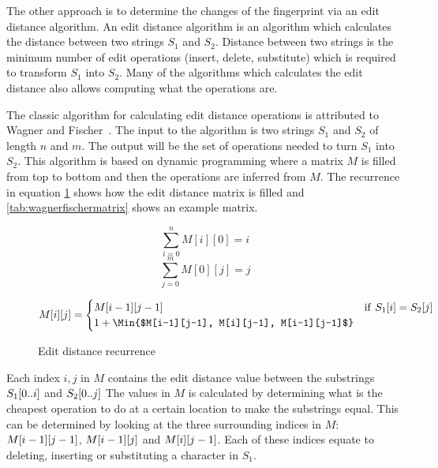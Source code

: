 The other approach is to determine the changes of the fingerprint via an edit distance
algorithm. An edit distance algorithm is an algorithm which calculates the distance
between two strings $S_1$ and $S_2$. Distance between two strings is the minimum number of
edit operations (insert, delete, substitute) which is required to transform $S_1$ into
$S_2$. Many of the algorithms which calculates the edit distance also allows computing
what the operations are.

The classic algorithm for calculating edit distance operations is attributed to Wagner and
Fischer~\cite{WagnerFischer}. The input to the algorithm is two strings $S_1$ and $S_2$ of
length $n$ and $m$. The output will be the set of operations needed to turn $S_1$ into
$S_2$. This algorithm is based on dynamic programming where a matrix $M$ is filled from
top to bottom and then the operations are inferred from $M$. The recurrence in equation
\ref{eq:editdistancerecurrence} shows how the edit distance matrix is filled and
\ref{tab:wagnerfischermatrix} shows an example matrix.

\begin{figure}[t]
    \begin{center}
	$$
		\sum^{n}_{i = 0}{M[i][0] = i}
	$$
	$$
		\sum^{m}_{j = 0}{M[0][j] = j}
	$$

	\begin{gather*}
		M[i][j] =
		\begin{cases}
			M[i-1][j-1] & \mathrm{if\ } S_1[i] = S_2[j] \\
            1 + \Min{$M[i-1][j-1], M[i][j-1], M[i-1][j-1]$}
		\end{cases}
	\end{gather*}
	\caption{Edit distance recurrence}
	\label{eq:editdistancerecurrence}
    \end{center}
\end{figure}

Each index $i, j$ in $M$ contains the edit distance value between the substrings
$S_1[{0..i}]$ and $S_2[{0..j}]$ The values in $M$ is calculated by
determining what is the cheapest operation to do at a certain location to make the
substrings equal. This can be determined by looking at the three surrounding indices in
$M$: $M[{i - 1}][{j - 1}]$, $M[{i - 1}][{j}]$ and
$M[{i}][{j - 1}]$. Each of these indices equate to deleting, inserting or
substituting a character in $S_1$. 

